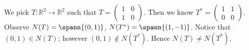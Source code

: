 \begin{Exercise}
\begin{solution}
We pick $T:\mathbb{R}^2\to\mathbb{R}^2$ such that $T = \begin{pmatrix}
1 & 0 \\
1 & 0
\end{pmatrix}$. Then we know $T^* = \begin{pmatrix}
1 & 1 \\
0 & 0
\end{pmatrix}$. Observe $N(T) = \spann\{(0,1)\}$, $N(T^*) = \spann\{(1,-1)\}$. Notice that $(0,1) \in N(T)$; however $(0,1)\notin N(T^*)$. Hence $N(T)\neq N(T^*)$.
\end{solution}
\end{Exercise}